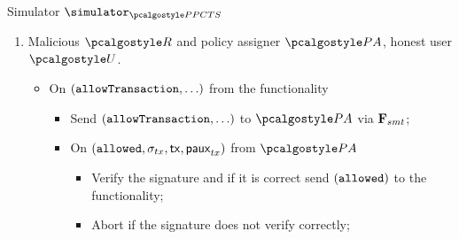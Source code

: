\documentclass[runningheads,10pt]{llncs}
\numberwithin{equation}{section}
\begin{document}
\begin{simbox}{Simulator $\simulator_{\PPCTS}$}
\begin{enumerate}
\begin{itemize}
    \item On input $(\sendAnonymously, \relay, \txdata)$ sent to $\func{amt}$
      by $\user$, read from $\txdata$: $\auxacc$, $\inp_{val} = (\tx,
      \paux_{tx}), \inp_{comp} = (\tx, \paux_{tx}, \polas, \policydig)$
      \begin{itemize}
      \item Abort if the provided proofs $\zkproof_{val}$ or $\zkproof_{comp}$ do not
        verify.
      \item Use $\func{nizk}^{\REL_{val}}$ and $\func{nizk}^{\REL_{comp}}$ to extract
        witnesses $\wit_{val} = (\saux_{tx})$ and
        $\wit_{comp} = (\comppolicy, \signature_{comp}, \signature_{tx}, \key, r)$,
        output $\fail$ if this fails.
      \item Output $\fail$ if $\signature_{comp}$ not in the list
        $\listvar{pol}$ or $\signature_{tx}$ not in the list $\listvar{tx}$.
      \item Otherwise, call functionality $\func{\PPCTS}$ on input
        $(\sendTransaction, \tx, \paux_{tx}, \saux_{tx}, \auxacc, 
        \polas, \policydig, \signature_{comp}, \relay)$ if that has not been done already.
      \end{itemize}
    \end{itemize}
  \item Malicious $\relay$ and policy assigner $\polas$, honest user $\user$.
    \begin{itemize}
    \item On $(\mathtt{allowTransaction}, \ldots)$ from the functionality
      \begin{itemize}
      \item Send $(\mathtt{allowTransaction}, \ldots)$ to $\polas$ via $\mathbf{F}_{{smt}}$;
      \item On $(\mathtt{allowed}, \sigma_{tx}, \mathsf{tx}, \mathsf{paux}_{tx})$ from $\polas$
        \begin{itemize}
        \item Verify the signature and if it is correct send $(\mathtt{allowed})$ to
        the functionality;
        \item Abort if the signature does not verify correctly;
        \end{itemize}

\end{itemize}
\end{itemize}
\end{enumerate}
\end{simbox}
\end{document}

